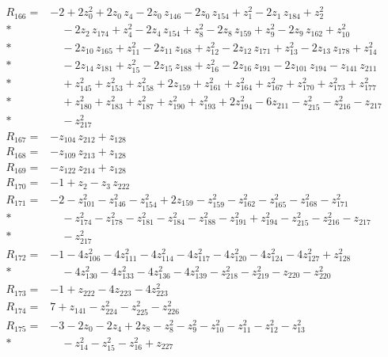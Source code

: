 \begin{align*}
R_{166}={}& -2 + 2z_{0}^{2} + 2z_{0}\,z_{4} - 2z_{0}\,z_{146} - 2z_{0}\,z_{154} + z_{1}^{2} - 2z_{1}\,z_{184} + z_{2}^{2} \\*
&\quad  - 2z_{2}\,z_{174} + z_{4}^{2} - 2z_{4}\,z_{154} + z_{8}^{2} - 2z_{8}\,z_{159} + z_{9}^{2} - 2z_{9}\,z_{162} + z_{10}^{2} \\*
&\quad  - 2z_{10}\,z_{165} + z_{11}^{2} - 2z_{11}\,z_{168} + z_{12}^{2} - 2z_{12}\,z_{171} + z_{13}^{2} - 2z_{13}\,z_{178} + z_{14}^{2} \\*
&\quad  - 2z_{14}\,z_{181} + z_{15}^{2} - 2z_{15}\,z_{188} + z_{16}^{2} - 2z_{16}\,z_{191} - 2z_{101}\,z_{194} - z_{141}\,z_{211} \\*
&\quad  + z_{145}^{2} + z_{153}^{2} + z_{158}^{2} + 2z_{159} + z_{161}^{2} + z_{164}^{2} + z_{167}^{2} + z_{170}^{2} + z_{173}^{2} + z_{177}^{2} \\*
&\quad  + z_{180}^{2} + z_{183}^{2} + z_{187}^{2} + z_{190}^{2} + z_{193}^{2} + 2z_{194}^{2} - 6z_{211} - z_{215}^{2} - z_{216}^{2} - z_{217} \\*
&\quad  - z_{217}^{2} \\[2pt]
R_{167}={}& -z_{104}\,z_{212} + z_{128} \\[2pt]
R_{168}={}& -z_{109}\,z_{213} + z_{128} \\[2pt]
R_{169}={}& -z_{122}\,z_{214} + z_{128} \\[2pt]
R_{170}={}& -1 + z_{2} - z_{3}\,z_{222} \\[2pt]
R_{171}={}& -2 - z_{101}^{2} - z_{146}^{2} - z_{154}^{2} + 2z_{159} - z_{159}^{2} - z_{162}^{2} - z_{165}^{2} - z_{168}^{2} - z_{171}^{2} \\*
&\quad  - z_{174}^{2} - z_{178}^{2} - z_{181}^{2} - z_{184}^{2} - z_{188}^{2} - z_{191}^{2} + z_{194}^{2} - z_{215}^{2} - z_{216}^{2} - z_{217} \\*
&\quad  - z_{217}^{2} \\[2pt]
R_{172}={}& -1 - 4z_{106}^{2} - 4z_{111}^{2} - 4z_{114}^{2} - 4z_{117}^{2} - 4z_{120}^{2} - 4z_{124}^{2} - 4z_{127}^{2} + z_{128}^{2} \\*
&\quad  - 4z_{130}^{2} - 4z_{133}^{2} - 4z_{136}^{2} - 4z_{139}^{2} - z_{218}^{2} - z_{219}^{2} - z_{220} - z_{220}^{2} \\[2pt]
R_{173}={}& -1 + z_{222} - 4z_{223} - 4z_{223}^{2} \\[2pt]
R_{174}={}& 7 + z_{141} - z_{224}^{2} - z_{225}^{2} - z_{226}^{2} \\[2pt]
R_{175}={}& -3 - 2z_{0} - 2z_{4} + 2z_{8} - z_{8}^{2} - z_{9}^{2} - z_{10}^{2} - z_{11}^{2} - z_{12}^{2} - z_{13}^{2} \\*
&\quad  - z_{14}^{2} - z_{15}^{2} - z_{16}^{2} + z_{227} \\
\end{align*}
\endgroup
